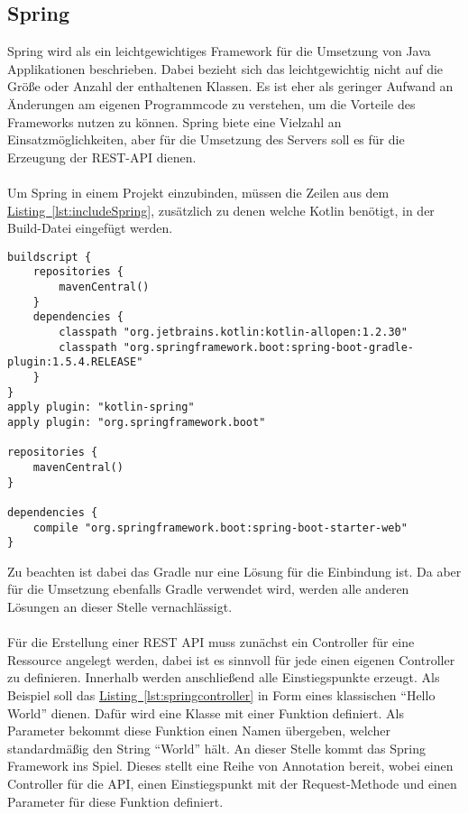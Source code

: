 \subsection{Spring}\label{sec:bibspring}
Spring wird als ein leichtgewichtiges Framework für die Umsetzung von Java Applikationen beschrieben. Dabei bezieht sich das leichtgewichtig nicht auf die Größe oder Anzahl der enthaltenen Klassen. Es ist eher als geringer Aufwand an Änderungen am eigenen Programmcode zu verstehen, um die Vorteile des Frameworks nutzen zu können. \cite{proSpring5} Spring biete eine Vielzahl an Einsatzmöglichkeiten, aber für die Umsetzung des Servers soll es für die Erzeugung der \gls{REST}-\gls{API} dienen.\\
\\
Um Spring in einem Projekt einzubinden, müssen die Zeilen aus dem \hyperref[lst:includeSpring]{Listing~\ref{lst:includeSpring}}, zusätzlich zu denen welche Kotlin benötigt, in der Build-Datei  eingefügt werden.
\begin{lstlisting}[style=lstStyleFramed, language=Gradle, caption={Einbindung des Spring Framework mithilfe von Gradle}, label=lst:includeSpring, float]
buildscript {
	repositories {
		mavenCentral()
	}
	dependencies {
		classpath "org.jetbrains.kotlin:kotlin-allopen:1.2.30"
		classpath "org.springframework.boot:spring-boot-gradle-plugin:1.5.4.RELEASE"
	}
}
apply plugin: "kotlin-spring"
apply plugin: "org.springframework.boot"

repositories {
	mavenCentral()
}

dependencies {
	compile "org.springframework.boot:spring-boot-starter-web"
}
\end{lstlisting}
Zu beachten ist dabei das Gradle nur eine Lösung für die Einbindung ist. Da aber für die Umsetzung ebenfalls Gradle verwendet wird, werden alle anderen Lösungen an dieser Stelle vernachlässigt.\\
\\ 
Für die Erstellung einer \gls{REST} \gls{API} muss zunächst ein Controller für eine Ressource angelegt werden, dabei ist es sinnvoll für jede einen eigenen Controller zu definieren. Innerhalb werden anschließend alle Einstiegspunkte erzeugt. Als Beispiel soll das \hyperref[lst:springcontroller]{Listing~\ref{lst:springcontroller}} in Form eines klassischen \enquote{Hello World} dienen. Dafür wird eine Klasse  mit einer Funktion  definiert. Als Parameter bekommt diese Funktion einen Namen übergeben, welcher standardmäßig den String \enquote{World} hält. An dieser Stelle kommt das Spring Framework ins Spiel. Dieses stellt eine Reihe von Annotation bereit, wobei  einen Controller für die \gls{API},  einen Einstiegspunkt mit der Request-Methode  und  einen Parameter für diese Funktion definiert. 
